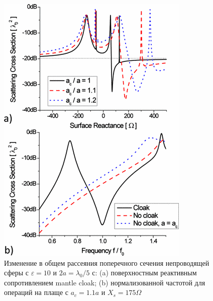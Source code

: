 \documentclass[12pt,a4paper]{article}
\begin{document}
\begin{figure}[t]
  \centering
  \includegraphics[height=0.3\paperheight, width=0.4\paperwidth]{2.png}
  \caption{Изменение в общем рассеяния поперечного сечения непроводящей сферы с $\varepsilon
  =10$ и $2a=\lambda_0/5$ с: (a) поверхностным реактивным сопротивлением mantle cloak; (b)
  нормализованной частотой для операций на плаще с $a_c=1.1a$ и $X_s=175\Omega$}
  \label{fig:2}
\end{figure}
\end{document}
